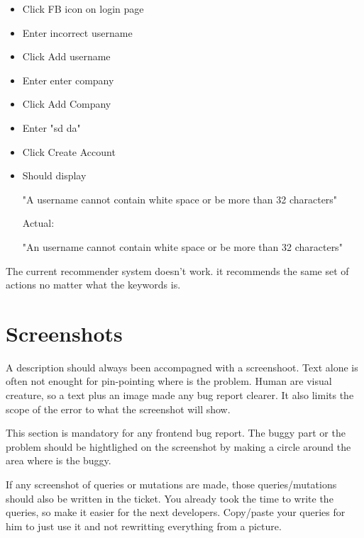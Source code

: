 \documentclass[a4paper,article,oneside]{memoir}
\begin{document}
\noindent{}

\begin{itemize}
  \item Click FB icon on login page
  \item Enter incorrect username
  \item Click Add username
  \item Enter enter company
  \item Click Add Company
  \item Enter "sd da"
  \item Click Create Account
  \item {Should display

"A username cannot contain white space or be more than 32 characters"

Actual:

"An username cannot contain white space or be more than 32 characters"}
\end{itemize}

\noindent{}

The current recommender system doesn't work. it recommends the same set of actions no matter what the keywords is.

        \section{Screenshots}
        A description should always been accompagned with a screenshoot. Text alone is often not enought for pin-pointing where is the problem. Human are visual creature, so a text plus an image made any bug report clearer. It also limits the scope of the error to what the screenshot will show.
        
        This section is mandatory for any frontend bug report. The buggy part or the problem should be hightlighed on the screenshot by making a circle around the area where is the buggy.

If any screenshot of queries or mutations are made, those queries/mutations should also be written in the ticket. You already took the time to write the queries, so make it easier for the next developers. Copy/paste your queries for him to just use it and not rewritting everything from a picture.
        
\noindent{}

\noindent{}  

\printglossary[nonumberlist]
\end{document}
